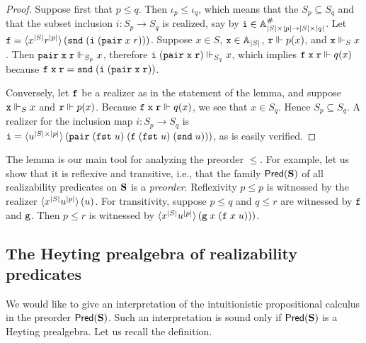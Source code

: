 \begin{proof}
  Suppose first that $p \leq q$. Then $\iota_p \leq \iota_q$, which
  means that the $S_p \subseteq S_q$ and that the subset inclusion $i
  : S_p \to S_q$ is realized, say by $\mathtt{i} \in \mathbb{A}^{\#}_{|S| \times
    |p| \to |S| \times |q|}$. Let $\mathtt{f} = \langle x^{|S|}
    r^{|p|} \rangle\,(\mathtt{snd}\;(\mathtt{i}\;(\mathtt{pair}\;x\;r)))$. Suppose $x
  \in S$, $\mathtt{x} \in \mathbb{A}_{|S|}$, $\mathtt{r} \Vdash p(x)$, and $\mathtt{x} \Vdash_S
  x$. Then $\mathtt{pair}\;\mathtt{x}\;\mathtt{r} \Vdash_{S_p} x$, therefore
  $\mathtt{i}\;(\mathtt{pair}\;\mathtt{x}\;\mathtt{r}) \Vdash_{S_q} x$, which implies
  $\mathtt{f}\;\mathtt{x}\;\mathtt{r} \Vdash q(x)$ because $\mathtt{f}\;\mathtt{x}\;\mathtt{r} =
  \mathtt{snd}\;(\mathtt{i}\;(\mathtt{pair}\;\mathtt{x}\;\mathtt{r}))$.

  Conversely, let $\mathtt{f}$ be a realizer as in the statement of the
  lemma, and suppose $\mathtt{x} \Vdash_S x$ and $\mathtt{r} \Vdash p(x)$. Because
  $\mathtt{f}\;\mathtt{x}\;\mathtt{r} \Vdash q(x)$, we see that $x \in S_q$. Hence $S_p
  \subseteq S_q$. A realizer for the inclusion map $i : S_p \to S_q$
  is $\mathtt{i} = \langle u^{|S| \times
      |p|} \rangle\,(\mathtt{pair}\;(\mathtt{fst}\;u)\;(\mathtt{f}\;(\mathtt{fst}\;u)\;(\mathtt{snd}\;u)))$,
  as is easily verified.
\end{proof}

The lemma is our main tool for analyzing the preorder $\leq$. For
example, let us show that it is reflexive and transitive, i.e., that
the family $\mathsf{Pred}(\mathbf{S})$ of all realizability predicates on
$\mathbf{S}$ is a \emph{preorder}. Reflexivity $p \leq p$ is witnessed by
the realizer $\langle x^{|S|} u^{|p|} \rangle\,(u)$. For
transitivity, suppose $p \leq q$ and $q \leq r$ are witnessed by
$\mathtt{f}$ and $\mathtt{g}$. Then $p \leq r$ is witnessed by
$\langle x^{|S|} u^{|p|} \rangle\,(\mathtt{g}\;x\;(\mathtt{f}\;x\;u)))$.


\subsection{The Heyting prealgebra of realizability predicates}
\label{sec:heyting-prealgebra}

We would like to give an interpretation of the intuitionistic
propositional calculus in the preorder $\mathsf{Pred}(\mathbf{S})$. Such an
interpretation is sound only if $\mathsf{Pred}(\mathbf{S})$ is a Heyting
prealgebra. Let us recall the definition.

